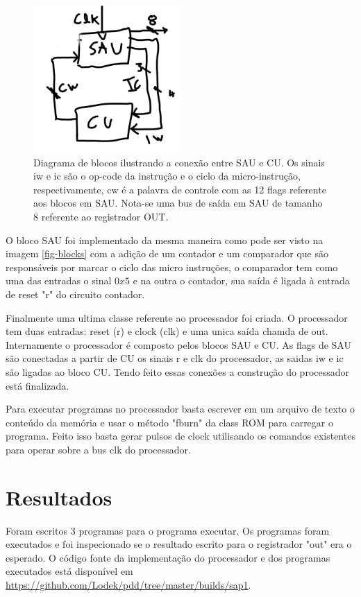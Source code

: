 \documentclass[11pt, twocolumn]{article}
\begin{document}
   \begin{figure}
     \includegraphics[width=0.5\textwidth]{cu.jpg}
     \caption{Diagrama de blocos ilustrando a conexão entre SAU e CU. Os sinais iw e ic são o op-code da instrução e o ciclo da micro-instrução, respectivamente, cw é a palavra de controle com as 12 flags referente aos blocos em SAU. Nota-se uma bus de saída em SAU de tamanho 8 referente ao registrador OUT.}
     \label{fig-cu}
   \end{figure}
 
O bloco SAU foi implementado da mesma maneira como pode ser visto na imagem \ref{fig-blocks} com a adição de um contador e um comparador que são responsáveis por marcar o ciclo das micro instruções, o comparador tem como uma das entradas o sinal $0x5$ e na outra o contador, sua saída é ligada à entrada de reset "r" do circuito contador.

Finalmente uma ultima classe referente ao processador foi criada. O processador tem duas entradas: reset (r) e clock (clk) e uma unica saída chamda de out. Internamente o processador é composto pelos blocos SAU e CU. As flags de SAU são conectadas a partir de CU os sinais r e clk do processador, as saidas iw e ic são ligadas ao bloco CU. Tendo feito essas conexões a construção do processador está finalizada.

Para executar programas no processador basta escrever em um arquivo de texto o conteúdo da memória e usar o método "fburn" da class ROM para carregar o programa. Feito isso basta gerar pulsos de clock utilisando os comandos existentes para operar sobre a bus clk do processador.

\section{Resultados}

Foram escritos 3 programas para o programa executar. Os programas foram executados e foi inspecionado se o resultado escrito para o registrador "out" era o esperado. O código fonte da implementação do processador e dos programas executados está disponível em \url{https://github.com/Lodek/pdd/tree/master/builds/sap1}.
\end{document}

